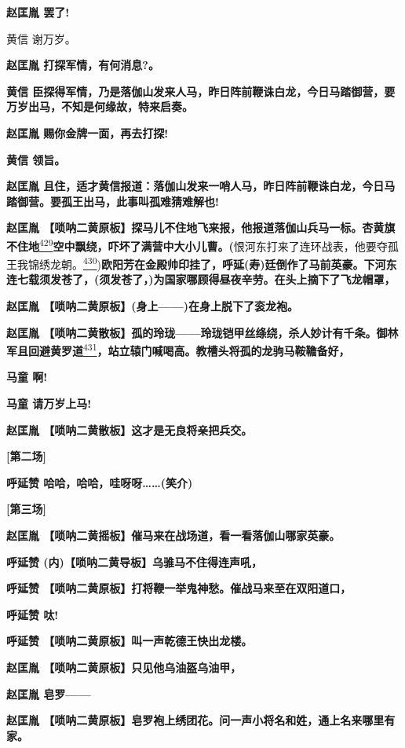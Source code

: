 \textbf{赵匡胤 罢了!}

黄信 谢万岁。

\textbf{赵匡胤 打探军情，有何消息?。}

\textbf{黄信
臣探得军情，乃是落伽山发来人马，昨日阵前鞭诛白龙，今日马踏御营，要万岁出马，不知是何缘故，特来启奏。}

\textbf{赵匡胤 赐你金牌一面，再去打探!}

\textbf{黄信 领旨。}

\textbf{赵匡胤
且住，适才黄信报道：落伽山发来一哨人马，昨日阵前鞭诛白龙，今日马踏御营。要孤王出马，此事叫孤难猜难解也!}

\textbf{赵匡胤
【唢呐二黄原板】探马儿不住地飞来报，他报道落伽山兵马一标。杏黄旗不住地}\protect\hyperlink{fn429}{\textsuperscript{429}}\textbf{空中飘绕，吓坏了满营中大小儿曹。(}恨河东打来了连环战表，他要夺孤王我锦绣龙朝。\protect\hyperlink{fn430}{\textsuperscript{430}})\textbf{欧阳芳在金殿帅印挂了，呼延(寿)廷倒作了马前英豪。下河东连七载须发苍了，(须发苍了，)为国家哪顾得昼夜辛劳。在头上摘下了飞龙帽罩，}

\textbf{赵匡胤 【唢呐二黄原板】(身上------)在身上脱下了衮龙袍。}

\textbf{赵匡胤
【唢呐二黄散板】孤的玲珑------玲珑铠甲丝绦绕，杀人妙计有千条。御林军且回避黄罗道}\protect\hyperlink{fn431}{\textsuperscript{431}}\textbf{，站立辕门喊喝高。教槽头将孤的龙驹马鞍韂备好，}

\textbf{马童 啊!}

\textbf{马童 请万岁上马!}

\textbf{赵匡胤 【唢呐二黄散板】这才是无良将亲把兵交。}

\textbf{{[}第二场{]}}

\textbf{呼延赞 哈哈，哈哈，哇呀呀\ldots{}\ldots{}(笑介)}

\textbf{{[}第三场{]}}

\textbf{赵匡胤 【唢呐二黄摇板】催马来在战场道，看一看落伽山哪家英豪。}

\textbf{呼延赞 (内)【唢呐二黄导板】乌骓马不住得连声吼，}

\textbf{呼延赞 【唢呐二黄原板】打将鞭一举鬼神愁。催战马来至在双阳道口，}

\textbf{呼延赞 呔!}

\textbf{呼延赞 【唢呐二黄原板】叫一声乾德王快出龙楼。}

\textbf{赵匡胤 【唢呐二黄原板】只见他乌油盔乌油甲，}

\textbf{赵匡胤 皂罗------}

\textbf{赵匡胤
【唢呐二黄原板】皂罗袍上绣团花。问一声小将名和姓，通上名来哪里有家。}

